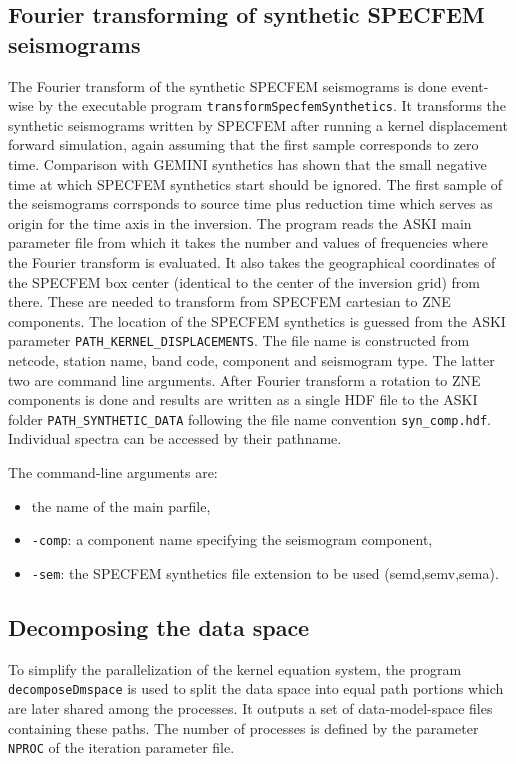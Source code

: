 \subsection{Fourier transforming of synthetic SPECFEM seismograms}
%
The Fourier transform of the synthetic SPECFEM seismograms is done event-wise by the executable program \verb+transformSpecfemSynthetics+. It transforms the synthetic seismograms written by SPECFEM after running a kernel displacement forward simulation, again assuming that the first sample corresponds to zero time. Comparison with GEMINI synthetics has shown that the small negative time at which SPECFEM synthetics start should be ignored. The first sample of the seismograms corrsponds to source time plus reduction time which serves as origin for the time axis in the inversion.
 The program reads the ASKI main parameter file from which it takes the number and values of frequencies where the Fourier transform is evaluated. It also takes the geographical coordinates of the SPECFEM box center (identical to the center of the inversion grid) from there. These are needed to transform from SPECFEM cartesian to ZNE components. The location of the SPECFEM synthetics is guessed from the ASKI parameter \verb+PATH_KERNEL_DISPLACEMENTS+. The file name is constructed from netcode, station name, band code, component and seismogram type. The latter two are command line arguments. After Fourier transform a rotation to ZNE components is done and results are written as a single HDF file to the ASKI folder \verb+PATH_SYNTHETIC_DATA+ following the file name convention \verb+syn_comp.hdf+. Individual spectra can be accessed by their pathname.

 The command-line arguments are:
 \begin{itemize}
	\setlength{\itemsep}{-0.1cm}
   \item the name of the main parfile,
   \item \verb+-comp+: a component name specifying the seismogram component,
	\item \verb+-sem+: the SPECFEM synthetics file extension to be used (semd,semv,sema).
 \end{itemize}
%
\subsection{Decomposing the data space}
%
To simplify the parallelization of the kernel equation system, the program \verb+decomposeDmspace+ is used to split the data space into equal path portions which are later shared among the processes. It outputs a set of data-model-space files containing these paths. The number of processes is defined by the parameter \verb+NPROC+ of the iteration parameter file.


